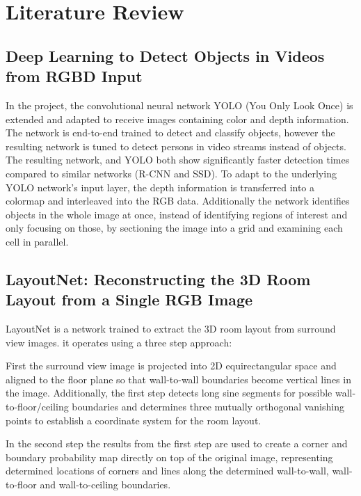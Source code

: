 \documentclass[sigconf]{acmart}
\begin{document}
\section{Literature Review}
\subsection{Deep Learning to Detect Objects in Videos from RGBD Input \cite{Ni9elf}}
In the project, the convolutional neural network YOLO (You Only Look Once) is extended and adapted to receive images containing color and depth information.
The network is end-to-end trained to detect and classify objects, however the resulting network is tuned to detect persons in video streams instead of objects.
The resulting network, and YOLO both show significantly faster detection times compared to similar networks (R-CNN and SSD).
To adapt to the underlying YOLO network's input layer, the depth information is transferred into a colormap and interleaved into the RGB data.
Additionally the network identifies objects in the whole image at once, instead of identifying regions of interest and only focusing on those, by sectioning the image into a grid and examining each cell in parallel.

\subsection{LayoutNet: Reconstructing the 3D Room Layout from a Single RGB Image \cite{LayoutNet}}
LayoutNet is a network trained to extract the 3D room layout from surround view images. it operates using a three step approach:

First the surround view image is projected into 2D equirectangular space and aligned to the floor plane so that wall-to-wall boundaries become vertical lines in the image.
Additionally, the first step detects long sine segments for possible wall-to-floor/ceiling boundaries and determines three mutually orthogonal vanishing points to establish a coordinate system for the room layout.

In the second step the results from the first step are used to create a corner and boundary probability map directly on top of the original image, representing determined locations of corners and lines along the determined wall-to-wall, wall-to-floor and wall-to-ceiling boundaries.
\end{document}
